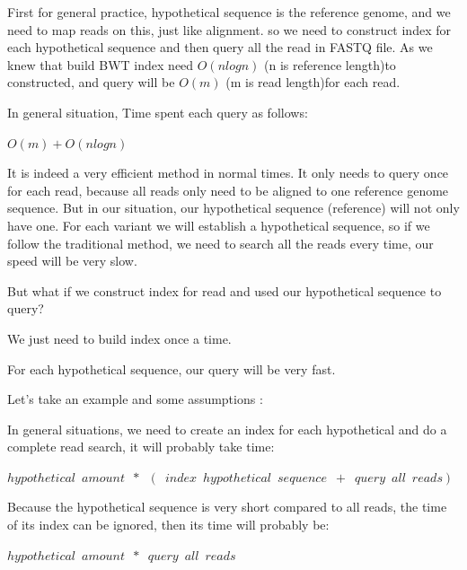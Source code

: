 First for general practice, hypothetical sequence is the reference genome, and we need to map reads on this, just like alignment. so we need to construct index for each hypothetical sequence and then query all the read in FASTQ file. As we knew that build BWT index need $O(nlogn)$  (n is reference length)to constructed, and query will be $O(m)$ (m is read length)for each read.
\begin{flushleft}
In general situation, Time spent each query as follows: 
\end{flushleft} 
\begin{center}
    $O(m)+O(nlogn)$
\end{center}  

It is indeed a very efficient method in normal times. It only needs to query once for each read, because all reads only need to be aligned to one reference genome sequence. But in our situation, our hypothetical sequence (reference) will not only have one. For each variant we will establish a hypothetical sequence, so if we follow the traditional method, we need to search all the reads every time, our speed will be very slow.

But what if we construct index for read and used our hypothetical sequence to query?
\begin{enumerate}
{
    \item We just need to build index once a time.
    \item For each hypothetical sequence, our query will be very fast.
}
\end{enumerate}

\begin{flushleft}
Let's take an example and some assumptions :
\end{flushleft}

In general situations, we need to create an index for each hypothetical and do a complete read search, it will probably take time:
\begin{center}
    $hypothetical\enspace amount\enspace*\enspace(\enspace index\enspace hypothetical\enspace sequence\enspace+\enspace query\enspace all\enspace reads)$
\end{center}  
\begin{flushleft}
Because the hypothetical sequence is very short compared to all reads, the time of its index can be ignored, then its time will probably be:
\end{flushleft}
\begin{center}
    $hypothetical\enspace amount\enspace*\enspace query\enspace all\enspace reads$
\end{center}  

